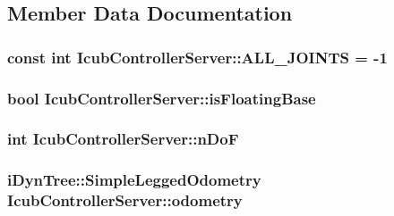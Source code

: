 \subsection{\-Member \-Data \-Documentation}
\hypertarget{classIcubControllerServer_aa977ca558c184e4331121522cc58d2e7}{
\subsubsection[{\-A\-L\-L\-\_\-\-J\-O\-I\-N\-T\-S}]{\setlength{\rightskip}{0pt plus 5cm}const int {\bf \-Icub\-Controller\-Server\-::\-A\-L\-L\-\_\-\-J\-O\-I\-N\-T\-S} = -\/1}}\label{classIcubControllerServer_aa977ca558c184e4331121522cc58d2e7}
\hypertarget{classIcubControllerServer_aebc2019921c3eabb53c01012fbd2355a}{
\subsubsection[{is\-Floating\-Base}]{\setlength{\rightskip}{0pt plus 5cm}bool {\bf \-Icub\-Controller\-Server\-::is\-Floating\-Base}}}\label{classIcubControllerServer_aebc2019921c3eabb53c01012fbd2355a}
\hypertarget{classIcubControllerServer_ab5fb1f18775cfe3036894c73dc21ebcf}{
\subsubsection[{n\-Do\-F}]{\setlength{\rightskip}{0pt plus 5cm}int {\bf \-Icub\-Controller\-Server\-::n\-Do\-F}}}\label{classIcubControllerServer_ab5fb1f18775cfe3036894c73dc21ebcf}
\hypertarget{classIcubControllerServer_ad0484106ab9d7fd42e2bd682338871c7}{
\subsubsection[{odometry}]{\setlength{\rightskip}{0pt plus 5cm}i\-Dyn\-Tree\-::\-Simple\-Legged\-Odometry {\bf \-Icub\-Controller\-Server\-::odometry}}}\label{classIcubControllerServer_ad0484106ab9d7fd42e2bd682338871c7}
